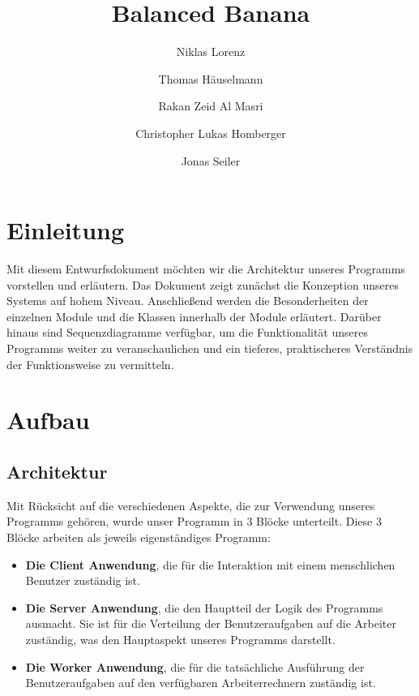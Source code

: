 \documentclass[a4paper,12pt]{article}
\title{Balanced Banana}
\author{Niklas Lorenz \and Thomas Häuselmann \and Rakan Zeid Al Masri \and Christopher Lukas Homberger \and Jonas Seiler}
\begin{document}
\setcounter{page}{2}
\tableofcontents          %
\clearpage
{}

\section{Einleitung}
\vspace{1cm}
Mit diesem Entwurfsdokument möchten wir die Architektur unseres Programms vorstellen und erläutern. Das Dokument zeigt zunächst die Konzeption unseres Systems auf hohem Niveau. Anschließend werden die Besonderheiten der einzelnen Module und die Klassen innerhalb der Module erläutert. Darüber hinaus sind Sequenzdiagramme verfügbar, um die Funktionalität unseres Programms weiter zu veranschaulichen und ein tieferes, praktischeres Verständnis der Funktionsweise zu vermitteln.
\clearpage
\section{Aufbau}

\subsection{Architektur}

Mit Rücksicht auf die verschiedenen Aspekte, die zur Verwendung unseres Programms gehören, wurde unser Programm in 3 Blöcke unterteilt. Diese 3 Blöcke arbeiten als jeweils eigenständiges Programm:\newline

\begin{itemize}
	\item \textbf{Die Client Anwendung}, die für die Interaktion mit einem menschlichen Benutzer zuständig ist.
	
	\item \textbf{Die Server Anwendung}, die den Hauptteil der Logik des Programms ausmacht. Sie ist für die Verteilung der Benutzeraufgaben auf die Arbeiter zuständig, was den Hauptaspekt unseres Programms darstellt.
	
	\item \textbf{Die Worker Anwendung}, die für die tatsächliche Ausführung der Benutzeraufgaben auf den verfügbaren Arbeiterrechnern zuständig ist.

\end{itemize}
\end{document}
